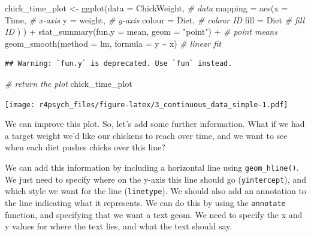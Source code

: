 \documentclass[
]{book}
\newenvironment{Shaded}{\begin{snugshade}}{\end{snugshade}}
\newcommand{\AttributeTok}[1]{\textcolor[rgb]{0.77,0.63,0.00}{#1}}
\newcommand{\CommentTok}[1]{\textcolor[rgb]{0.56,0.35,0.01}{\textit{#1}}}
\newcommand{\FunctionTok}[1]{\textcolor[rgb]{0.00,0.00,0.00}{#1}}
\newcommand{\NormalTok}[1]{#1}
\newcommand{\OtherTok}[1]{\textcolor[rgb]{0.56,0.35,0.01}{#1}}
\newcommand{\SpecialCharTok}[1]{\textcolor[rgb]{0.00,0.00,0.00}{#1}}
\newcommand{\StringTok}[1]{\textcolor[rgb]{0.31,0.60,0.02}{#1}}
\begin{document}
\begin{Shaded}
\begin{Highlighting}[]
\NormalTok{chick\_time\_plot }\OtherTok{\textless{}{-}} \FunctionTok{ggplot}\NormalTok{(}\AttributeTok{data =}\NormalTok{ ChickWeight, }\CommentTok{\# data}
                          \AttributeTok{mapping =} \FunctionTok{aes}\NormalTok{(}\AttributeTok{x =}\NormalTok{ Time, }\CommentTok{\# x{-}axis}
                                        \AttributeTok{y =}\NormalTok{ weight, }\CommentTok{\# y{-}axis}
                                        \AttributeTok{colour =}\NormalTok{ Diet, }\CommentTok{\# colour ID}
                                        \AttributeTok{fill =}\NormalTok{ Diet }\CommentTok{\# fill ID}
\NormalTok{                                        )}
\NormalTok{                          ) }\SpecialCharTok{+}
  \FunctionTok{stat\_summary}\NormalTok{(}\AttributeTok{fun.y =}\NormalTok{ mean, }\AttributeTok{geom =} \StringTok{"point"}\NormalTok{) }\SpecialCharTok{+} \CommentTok{\# point means}
  \FunctionTok{geom\_smooth}\NormalTok{(}\AttributeTok{method =} \StringTok{\textquotesingle{}lm\textquotesingle{}}\NormalTok{, }\AttributeTok{formula =}\NormalTok{ y }\SpecialCharTok{\textasciitilde{}}\NormalTok{ x) }\CommentTok{\# linear fit}
\end{Highlighting}
\end{Shaded}

\begin{verbatim}
## Warning: `fun.y` is deprecated. Use `fun` instead.
\end{verbatim}

\begin{Shaded}
\begin{Highlighting}[]
\CommentTok{\# return the plot}
\NormalTok{chick\_time\_plot}
\end{Highlighting}
\end{Shaded}

\texttt{[image: r4psych\_files/figure-latex/3\_continuous\_data\_simple-1.pdf]}

We can improve this plot. So, let's add some further information. What if we had a target weight we'd like our chickens to reach over time, and we want to see when each diet pushes chicks over this line?

We can add this information by including a horizontal line using \texttt{geom\_hline()}. We just need to specify where on the y-axis this line should go (\texttt{yintercept}), and which style we want for the line (\texttt{linetype}). We should also add an annotation to the line indicating what it represents. We can do this by using the \texttt{annotate} function, and specifying that we want a text geom. We need to specify the x and y values for where the text lies, and what the text should say.
\end{document}
